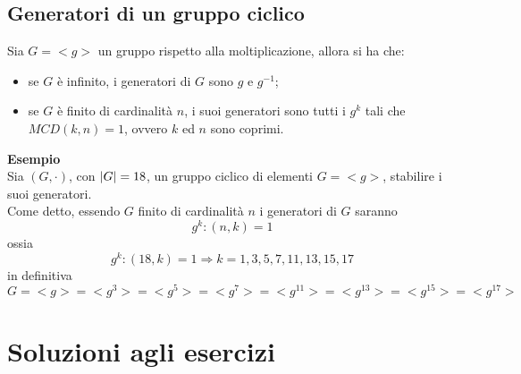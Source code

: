 \begin{flushleft}
\subsection{Generatori di un gruppo ciclico}
Sia $G = <g>$ un gruppo rispetto alla moltiplicazione, allora si ha che:
\begin{itemize}
    \item se $G$ è infinito, i generatori di $G$ sono $g$ e $g^{-1}$;
    \item se $G$ è finito di cardinalità $n$, i suoi generatori sono tutti i $g^k$ tali che $MCD(k,n) = 1$, ovvero $k$ ed $n$ sono coprimi.
\end{itemize}
\vspace{10px}
\textbf{Esempio}\\
\vspace{10px}
Sia $(G, \cdot)$, con $\abs{G} = 18$, un gruppo ciclico di elementi $G = <g>$, stabilire i suoi generatori.\\
Come detto, essendo $G$ finito di cardinalità $n$ i generatori di $G$ saranno
\[g^k : (n,k) = 1\]
ossia
\[g^k: (18, k) = 1 \Rightarrow k=1,3,5,7,11,13,15,17\]
in definitiva
\[G = <g> = <g^3> = <g^5> = <g^7> =<g^{11}> = <g^{13}> =<g^{15}> = <g^{17}>\]



\section{Soluzioni agli esercizi}






\end{flushleft}










